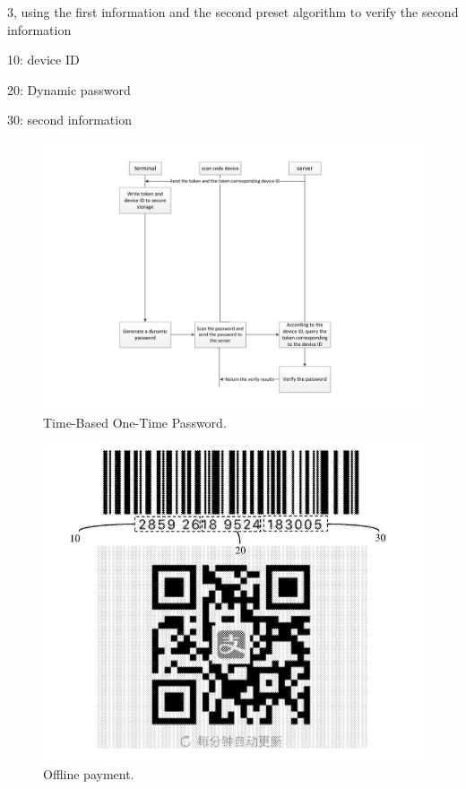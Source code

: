 \documentclass[journal]{IEEEtran}
\begin{document}
3, using the first information and the second preset algorithm to verify the second information




10: device ID

20: Dynamic password

30: second information

\begin{figure}[htbp]
\centerline{\includegraphics[scale=0.62]{TOTP2.pdf}}
\caption{Time-Based One-Time Password.}
\label{fig}
\end{figure}

\begin{figure}[htbp]
\centerline{\includegraphics[scale=0.6]{QRcode.png}}
\caption{Offline payment.}
\label{fig}
\end{figure}
\end{document}
